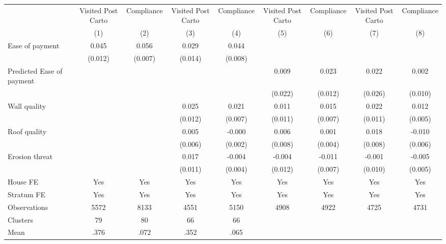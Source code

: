 \begin{tabular}{l*{8}{c}}
\toprule
                &\multicolumn{1}{c}{Visited Post Carto}&\multicolumn{1}{c}{Compliance}&\multicolumn{1}{c}{Visited Post Carto}&\multicolumn{1}{c}{Compliance}&\multicolumn{1}{c}{Visited Post Carto}&\multicolumn{1}{c}{Compliance}&\multicolumn{1}{c}{Visited Post Carto}&\multicolumn{1}{c}{Compliance}\\
                &\multicolumn{1}{c}{(1)}&\multicolumn{1}{c}{(2)}&\multicolumn{1}{c}{(3)}&\multicolumn{1}{c}{(4)}&\multicolumn{1}{c}{(5)}&\multicolumn{1}{c}{(6)}&\multicolumn{1}{c}{(7)}&\multicolumn{1}{c}{(8)}\\
\midrule
Ease of payment &    0.045&    0.056&    0.029&    0.044&         &         &         &         \\
                &  (0.012)&  (0.007)&  (0.014)&  (0.008)&         &         &         &         \\
Predicted Ease of payment&         &         &         &         &    0.009&    0.023&    0.022&    0.002\\
                &         &         &         &         &  (0.022)&  (0.012)&  (0.026)&  (0.010)\\
Wall quality    &         &         &    0.025&    0.021&    0.011&    0.015&    0.022&    0.012\\
                &         &         &  (0.012)&  (0.007)&  (0.011)&  (0.007)&  (0.011)&  (0.005)\\
Roof quality    &         &         &    0.005&   -0.000&    0.006&    0.001&    0.018&   -0.010\\
                &         &         &  (0.006)&  (0.002)&  (0.008)&  (0.004)&  (0.008)&  (0.006)\\
Erosion threat  &         &         &    0.017&   -0.004&   -0.004&   -0.011&   -0.001&   -0.005\\
                &         &         &  (0.011)&  (0.004)&  (0.012)&  (0.007)&  (0.010)&  (0.005)\\
House FE        &      Yes&      Yes&      Yes&      Yes&      Yes&      Yes&      Yes&      Yes\\
Stratum FE      &      Yes&      Yes&      Yes&      Yes&      Yes&      Yes&      Yes&      Yes\\
\midrule
Observations    &     5572&     8133&     4551&     5150&     4908&     4922&     4725&     4731\\
Clusters        &       79&       80&       66&       66&         &         &         &         \\
Mean            &     .376&     .072&     .352&     .065&         &         &         &         \\
\bottomrule
\end{tabular}
